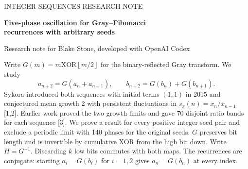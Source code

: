 \documentclass[11pt,letterpaper]{article}
\newcommand{\fl}[1]{\left\lfloor#1\right\rfloor}
\begin{document}
{\small\sffamily\color{ink} INTEGER SEQUENCES \hfill RESEARCH NOTE}\par
{\LARGE\bfseries Five-phase oscillation for Gray--Fibonacci\\[2pt] recurrences with arbitrary seeds}\par
{\small Research note for Blake Stone, developed with OpenAI Codex}\par
\medskip
Write $G(m)=m\mathbin{\mathrm{XOR}}\fl{m/2}$ for the binary-reflected Gray transform. We study
\[
 a_{n+2}=G(a_n+a_{n+1}),\qquad b_{n+2}=G(b_n)+G(b_{n+1}).
\]
Sykora introduced both sequences with initial terms $(1,1)$ in 2015 and conjectured mean growth 2 with persistent fluctuations in $s_x(n)=x_n/x_{n-1}$ [1,2]. Earlier work proved the two growth limits and gave 70 disjoint ratio bands for each sequence [3]. We prove a result for every positive integer seed pair and exclude a periodic limit with 140 phases for the original seeds. $G$ preserves bit length and is invertible by cumulative XOR from the high bit down. Write $H=G^{-1}$. Discarding $k$ low bits commutes with both maps. The recurrences are conjugate: starting $a_i=G(b_i)$ for $i=1,2$ gives $a_n=G(b_n)$ at every index.
\end{document}
